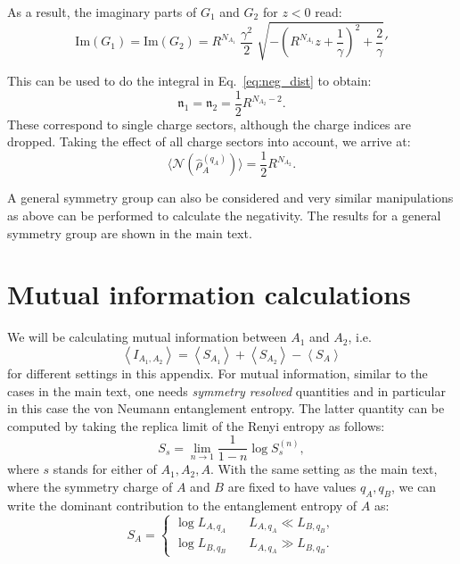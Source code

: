 \documentclass[aps,pra,reprint,superscriptaddress,twocolumn,notitlepage]{revtex4-1}
\numberwithin{equation}{section}
\renewcommand\theequation{\arabic{section}.\arabic{equation}}
\begin{document}
As a result, the imaginary parts of $G_1$ and $G_2$ for $z<0$ read:
\begin{equation}
    \mathrm{Im}(G_1) = \mathrm{Im}(G_2) = R^{N_{A_1}} \; \frac{\gamma^2}{2} \; \sqrt{-\left( R^{N_{A_1} } z + \frac{1}{\gamma} \right)^2 + \frac2\gamma}'
\end{equation}

This can be used to do the integral in Eq.~\eqref{eq:neg_dist} to obtain:
\begin{equation}
    \mathfrak{n}_1 =  \mathfrak{n}_2 = \frac12 R^{N_{A_2} - 2}.
\end{equation}
These correspond to single charge sectors, although the charge indices are dropped. Taking the effect of all charge sectors into account, we arrive at:
\begin{equation}
    \langle \mathcal{N}(\hat\rho_A^{(q_A)}) \rangle = \frac{1}{2} R^{N_{A_2}}.
\end{equation}

\bigskip


A general symmetry group can also be considered and very similar manipulations as above can be performed to calculate the negativity. The results for a general symmetry group are shown in the main text.


\section{Mutual information calculations}
\label{app:mutual information}

\renewcommand\theequation{C\arabic{equation}}

We will be calculating mutual information between $A_1$ and $A_2$, i.e.
\begin{equation}
    \left\langle I_{A_1,A_2}\right\rangle = \left\langle S_{A_1} \right\rangle + \left\langle S_{A_2} \right\rangle - \left\langle S_{A} \right\rangle
\end{equation}
for different settings in this appendix. For mutual information, similar to the cases in the main text, one needs {\it symmetry resolved} quantities and in particular in this case the von Neumann entanglement entropy. The latter quantity can be computed by taking the replica limit of the Renyi entropy as follows:
\begin{equation}
    S_{s} = \lim_{n \to 1} \frac1{1-n} \log S^{(n)}_s,
\end{equation}
where $s$ stands for either of $A_1,A_2,A$. With the same setting as the main text, where the symmetry charge of $A$ and $B$ are fixed to have values $q_A, q_B$, we can write the dominant contribution to the entanglement entropy of $A$ as:
\begin{equation}
    S_A = \begin{cases}
      \log L_{A,q_A} & \quad L_{A,q_A} \ll L_{B,q_B},\\
      \log L_{B,q_B} & \quad L_{A,q_A} \gg L_{B,q_B}.
    \end{cases}
\end{equation}
\end{document}
